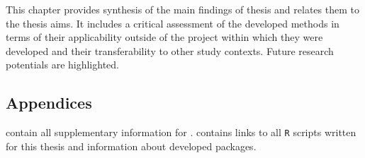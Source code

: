 This chapter provides synthesis of the main findings of thesis and relates them to the thesis aims. It includes a critical assessment of the developed methods in terms of their applicability outside of the project within which they were developed and their transferability to other study contexts. Future research potentials are highlighted.

\subsection*{Appendices}

 contain all supplementary information for .  contains links to all \texttt{R} scripts written for this thesis and information about developed packages.
